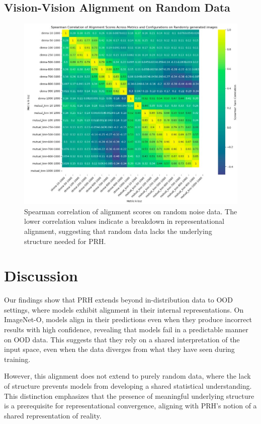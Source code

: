 \documentclass[10pt,a4paper]{article}
\begin{document}
\subsection{Vision-Vision Alignment on Random Data}
\begin{figure}[H]
    \centering
    \includegraphics[width=\textwidth]{prh_correlation_random.jpg}
    \caption{Spearman correlation of alignment scores on random noise data. The lower correlation values indicate a breakdown in representational alignment, suggesting that random data lacks the underlying structure needed for PRH.}
    \label{fig:prh_correlation_random}
\end{figure}

\section{Discussion}
Our findings show that PRH extends beyond in-distribution data to OOD settings, where models exhibit alignment in their internal representations. On ImageNet-O, models align in their predictions even when they produce incorrect results with high confidence, revealing that models fail in a predictable manner on OOD data. This suggests that they rely on a shared interpretation of the input space, even when the data diverges from what they have seen during training.

However, this alignment does not extend to purely random data, where the lack of structure prevents models from developing a shared statistical understanding. This distinction emphasizes that the presence of meaningful underlying structure is a prerequisite for representational convergence, aligning with PRH's notion of a shared representation of reality.
\end{document}
